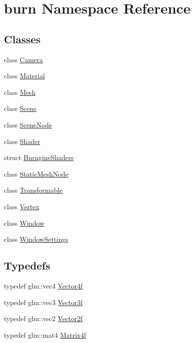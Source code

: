 \hypertarget{namespaceburn}{\section{burn Namespace Reference}
\label{namespaceburn}
}
\subsection*{Classes}
\begin{DoxyCompactItemize}
\item 
class \hyperlink{classburn_1_1_camera}{Camera}
\item 
class \hyperlink{classburn_1_1_material}{Material}
\item 
class \hyperlink{classburn_1_1_mesh}{Mesh}
\item 
class \hyperlink{classburn_1_1_scene}{Scene}
\item 
class \hyperlink{classburn_1_1_scene_node}{Scene\-Node}
\item 
class \hyperlink{classburn_1_1_shader}{Shader}
\item 
struct \hyperlink{structburn_1_1_burngine_shaders}{Burngine\-Shaders}
\item 
class \hyperlink{classburn_1_1_static_mesh_node}{Static\-Mesh\-Node}
\item 
class \hyperlink{classburn_1_1_transformable}{Transformable}
\item 
class \hyperlink{classburn_1_1_vertex}{Vertex}
\item 
class \hyperlink{classburn_1_1_window}{Window}
\item 
class \hyperlink{classburn_1_1_window_settings}{Window\-Settings}
\end{DoxyCompactItemize}
\subsection*{Typedefs}
\begin{DoxyCompactItemize}
\item 
typedef glm\-::vec4 \hyperlink{namespaceburn_a2907b7b4adbde67cc68c401d9a30bdfe}{Vector4f}
\item 
typedef glm\-::vec3 \hyperlink{namespaceburn_a9d6d349c94bc4dc9699427216128a0ef}{Vector3f}
\item 
typedef glm\-::vec2 \hyperlink{namespaceburn_a2af71ec5609a2f2d501827804e86a9b8}{Vector2f}
\item 
typedef glm\-::mat4 \hyperlink{namespaceburn_a643e9d2ffceb4304e3755a100268a7a3}{Matrix4f}
\end{DoxyCompactItemize}
